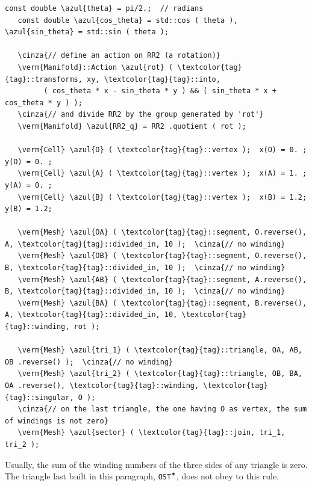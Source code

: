 \begin{Verbatim}[commandchars=\\\{\},formatcom=\small\tt,frame=single,
   label=parag-\ref{\numb section 7.\numb parag 12}.cpp,rulecolor=\color{coment},
   baselinestretch=0.94,framesep=2mm                                             ]
   const double \azul{theta} = pi/2.;  // radians
   const double \azul{cos_theta} = std::cos ( theta ), \azul{sin_theta} = std::sin ( theta );
	
   \cinza{// define an action on RR2 (a rotation)}
   \verm{Manifold}::Action \azul{rot} ( \textcolor{tag}{tag}::transforms, xy, \textcolor{tag}{tag}::into,
         ( cos_theta * x - sin_theta * y ) && ( sin_theta * x + cos_theta * y ) );
   \cinza{// and divide RR2 by the group generated by 'rot'}
   \verm{Manifold} \azul{RR2_q} = RR2 .quotient ( rot );

   \verm{Cell} \azul{O} ( \textcolor{tag}{tag}::vertex );  x(O) = 0. ;  y(O) = 0. ;
   \verm{Cell} \azul{A} ( \textcolor{tag}{tag}::vertex );  x(A) = 1. ;  y(A) = 0. ;
   \verm{Cell} \azul{B} ( \textcolor{tag}{tag}::vertex );  x(B) = 1.2;  y(B) = 1.2;

   \verm{Mesh} \azul{OA} ( \textcolor{tag}{tag}::segment, O.reverse(), A, \textcolor{tag}{tag}::divided_in, 10 );  \cinza{// no winding}
   \verm{Mesh} \azul{OB} ( \textcolor{tag}{tag}::segment, O.reverse(), B, \textcolor{tag}{tag}::divided_in, 10 );  \cinza{// no winding}
   \verm{Mesh} \azul{AB} ( \textcolor{tag}{tag}::segment, A.reverse(), B, \textcolor{tag}{tag}::divided_in, 10 );  \cinza{// no winding}
   \verm{Mesh} \azul{BA} ( \textcolor{tag}{tag}::segment, B.reverse(), A, \textcolor{tag}{tag}::divided_in, 10, \textcolor{tag}{tag}::winding, rot );

   \verm{Mesh} \azul{tri_1} ( \textcolor{tag}{tag}::triangle, OA, AB, OB .reverse() );  \cinza{// no winding}
   \verm{Mesh} \azul{tri_2} ( \textcolor{tag}{tag}::triangle, OB, BA, OA .reverse(), \textcolor{tag}{tag}::winding, \textcolor{tag}{tag}::singular, O );
   \cinza{// on the last triangle, the one having O as vertex, the sum of windings is not zero}
   \verm{Mesh} \azul{sector} ( \textcolor{tag}{tag}::join, tri_1, tri_2 );
\end{Verbatim}

Usually, the sum of the winding numbers of the three sides of any triangle is zero.
The triangle last built in this paragraph, {\small\tt OST$^{\mbox{\small\tt *}}$},
does not obey to this rule.


